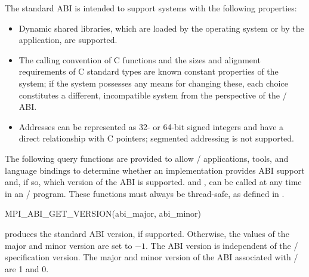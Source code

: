 The standard ABI is intended to support systems with the
following properties:
\begin{itemize}
    \item Dynamic shared libraries, which are loaded
          by the operating system or by the application,
          are supported.
    \item The calling convention of C functions and the
          sizes and alignment requirements of C standard
          types are known constant properties of the system;
          if the system possesses any means for changing
          these, each choice constitutes a different,
          incompatible system from the perspective of the \MPI/ ABI.
    \item Addresses can be represented as 32- or 64-bit signed
          integers and have a direct relationship with C pointers;
          segmented addressing is not supported.
\end{itemize}


The following query functions are provided to allow \MPI/ applications, tools, 
and language bindings to determine whether an implementation provides ABI support
and, if so, which version of the ABI is supported.
and ,
can be called at any time in an \MPI/ program.
These functions must always be thread-safe, as defined in
.

\begin{funcdef}{MPI\_ABI\_GET\_VERSION}{(\mbox{abi\_major}, \mbox{abi\_minor})}
\end{funcdef}

 produces the standard ABI version, if supported.
Otherwise, the values of the major and minor version are set to $-1$.
The ABI version is independent of the \MPI/ specification version.
The major and minor version of the ABI associated with \MPIVDOTO/
are 1 and 0.

